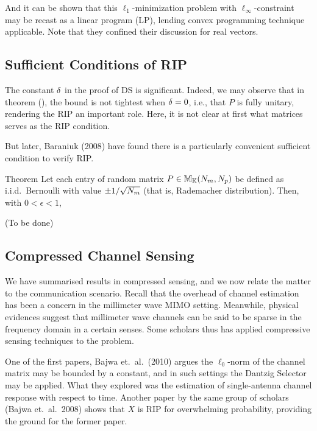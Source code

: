 And it can be shown that this \(\ell_1\)-minimization problem with \(\ell_\infty\)-constraint may be recast as a linear program (LP), lending convex programming technique applicable.
Note that they confined their discussion for real vectors.

\subsection{Sufficient Conditions of RIP}

The constant \(\delta\) in the proof of DS is significant.
Indeed, we may observe that in theorem (), the bound is not tightest when \(\delta=0\), i.e., that \(P\) is fully unitary, rendering the RIP an important role.
Here, it is not clear at first what matrices serves as the RIP condition.

But later, Baraniuk (2008) have found there is a particularly convenient sufficient condition to verify RIP.

\Result
{Theorem}
{
Let each entry of random matrix \(P \in \mathbb{M}_{\mathbb{K}} (N_m, N_p)\) be defined as i.i.d.\ Bernoulli with value \(\pm 1/\sqrt{N_m}\) (that is, Rademacher distribution).
Then, with \(0 <\epsilon <1\),
%
}

{ \color{red} (To be done) }

\subsection{Compressed Channel Sensing}

We have summarised results in compressed sensing, and we now relate the matter to the communication scenario.
Recall that the overhead of channel estimation has been a concern in the millimeter wave MIMO setting.
Meanwhile, physical evidences suggest that millimeter wave channels can be said to be sparse in the frequency domain in a certain senses.
Some scholars thus has applied compressive sensing techniques to the problem.

One of the first papers, Bajwa et.\ al.\ (2010) argues the \(\ell_0\)-norm of the channel matrix may be bounded by a constant, and in such settings the Dantzig Selector may be applied.
What they explored was the estimation of single-antenna channel response with respect to time.
Another paper by the same group of scholars (Bajwa et.\ al.\ 2008) shows that \(X\) is RIP for overwhelming probability, providing the ground for the former paper.


